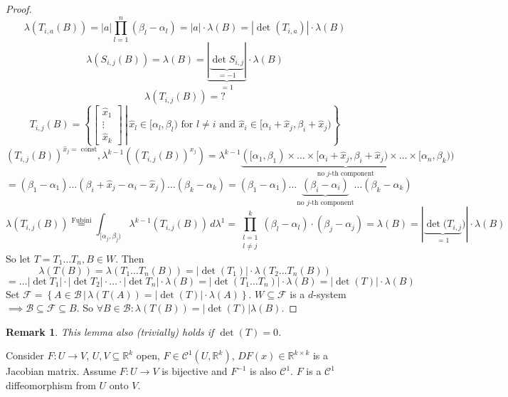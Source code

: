 \documentclass{article}
\newtheorem{remark}{Remark}  \numberwithin{remark}{section}
\newcommand{\setdef}[2]{\left\{\left.#1\,\right|\,#2\right\}}
\newcommand{\card}[1]{\left|#1\right|}
\begin{document}
\begin{proof}
  \[ \lambda(T_{i,a}(B)) = \card{a} \prod_{l=1}^n (\beta_l - \alpha_l) = \card{a} \cdot \lambda(B) = \card{\det(T_{i,a})} \cdot \lambda(B) \]
  \[ \lambda(S_{i,j}(B)) = \lambda(B) = \underbrace{\card{\underbrace{\det{S_{i,j}}}_{=-1}}}_{=1} \cdot \lambda(B) \]
  \[ \lambda(T_{i,j}(B)) = ? \]
  \[ T_{i,j}(B) = \setdef{\begin{bmatrix} \hat x_1 \\ \vdots \\ \hat x_k \end{bmatrix}}{\hat x_l \in [\alpha_l, \beta_l) \text{ for } l \neq i \text{ and } \hat x_i \in [\alpha_i + \hat x_j, \beta_i + \hat x_j)} \]
  \[ \left(T_{i,j}(B)\right)^{\hat x_j = \text{ const}}, \lambda^{k-1}\left((T_{i,j}(B))^{x_j}\right) = \lambda^{k-1}\underbrace{([\alpha_1, \beta_1) \times \dots \times [\alpha_i + \hat x_j, \beta_i + \hat x_j) \times \dots \times [\alpha_n, \beta_k)}_{\text{no } j\text{-th component}}) \]
  \[ = (\beta_1 - \alpha_1) \dots (\beta_i + \hat x_j - \alpha_i - \hat x_j) \dots (\beta_k - \alpha_k) = (\beta_1 - \alpha_1) \dots \underbrace{(\beta_i - \alpha_i)}_{\text{no } j\text{-th component}} \dots (\beta_k - \alpha_k) \]
  \[ \lambda(T_{i,j}(B)) \stackrel{\text{Fubini}}= \int_{[\alpha_j, \beta_j)} \lambda^{k-1}(T_{i,j}(B)) \, d\lambda^1 = \prod_{\substack{l=1 \\ l \neq j}}^k (\beta_l - \alpha_l) \cdot (\beta_j - \alpha_j) = \lambda(B) = \card{\underbrace{\det(T_{i,j}}_{=1})} \cdot \lambda(B) \]
  So let $T = T_1 \dots T_n, B \in W$. Then
  \[ \lambda(T(B)) = \lambda(T_1 \dots T_n(B)) = \card{\det(T_1)} \cdot \lambda(T_2 \dots T_n(B)) \]
  \[ = \dots \card{\det{T_1}} \cdot \card{\det{T_2}} \cdot \dots \cdot \card{\det{T_n}} \cdot \lambda(B) = \card{\det(T_1 \dots T_n)} \cdot \lambda(B) = \card{\det(T)} \cdot \lambda(B) \]
  Set $\mathcal F = \setdef{A \in \mathcal B}{\lambda(T(A)) = \card{\det(T)} \cdot \lambda(A)}$.
  $W \subseteq \mathcal F$ is a $d$-system $\implies \mathcal B \subseteq \mathcal F \subseteq B$.
  So $\forall B \in \mathcal B: \lambda(T(B)) = \card{\det(T)} \lambda(B)$.
\end{proof}

\begin{remark}
  This lemma also (trivially) holds if $\det(T) = 0$.
\end{remark}

Consider $F: U \to V$, $U, V \subseteq \mathbb R^k$ open, $F \in \mathcal C^1(U, \mathbb R^k)$, $DF(x) \in \mathbb R^{k\times k}$ is a Jacobian matrix.
Assume $F: U \to V$ is bijective and $F^{-1}$ is also $\mathcal C^1$.
$F$ is a $\mathcal{C}^1$ diffeomorphism from $U$ onto $V$.
\end{document}
